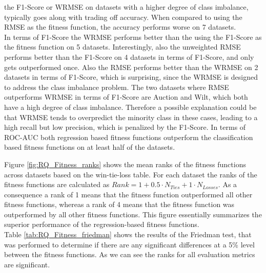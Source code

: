 \documentclass[manuscript, review, anonymous]{acmart} %
\begin{document}
the F1-Score or WRMSE on datasets with a higher degree
of class imbalance, typically goes along with trading off accuracy.
When compared to using the RMSE as the fitness function, the accuracy performs worse on 7 datasets.\\
In terms of F1-Score the WRMSE performs better than the using the F1-Score as the fitness function on 5 datasets.
Interestingly, also the unweighted RMSE performs better than the F1-Score on 4 datasets in terms of F1-Score,
and only gets outperformed once. Also the RMSE performs better than the WRMSE on 2 datasets in terms of F1-Score,
which is surprising, since the WRMSE is designed to address the class imbalance problem. The two datasets where 
RMSE outperforms WRMSE in terms of F1-Score are Auction and Wilt, which both have a high degree of class imbalance.
Therefore a possible explanation could be that WRMSE tends to overpredict the minority class in these cases, leading to a
high recall but low precision, which is penalized by the F1-Score. In terms of ROC-AUC
both regression based fitness functions outperform the classification based fitness functions on at least half of the datasets.

\noindent Figure \ref{fig:RQ_Fitness_ranks} shows the mean ranks of the fitness functions
across datasets based on the win-tie-loss table.
For each dataset the ranks of the fitness functions are
calculated as $Rank = 1 + 0.5 \cdot N_{Ties} +
1 \cdot N_{Losses}$.
As a consequence a rank of 1 means that the
fitness function outperformed all other fitness functions,
whereas a rank of 4 means that the fitness function
was outperformed by all other fitness functions.
This figure essentially summarizes the superior performance of the regression-based fitness functions.\\
Table \ref{tab:RQ_Fitness_friedman} shows the results of the Friedman test, that
was performed to determine if there are any
significant differences at a 5\% level between the fitness functions. As we can see the ranks for all evaluation metrics are significant.

\end{document}
